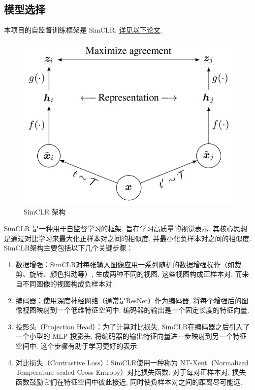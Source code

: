 \documentclass[notitlepage,cs4size,punct,oneside]{ctexrep}
\numberwithin{equation}{chapter}
\theoremstyle{mystyle}
\begin{document}
\subsection{模型选择}
本项目的自监督训练框架是 SimCLR, \href{http://proceedings.mlr.press/v119/chen20j/chen20j.pdf}{详见以下论文}.
\begin{figure}[H]
    \centering
    \includegraphics[scale=0.6]{simclr.png}
    \caption{SimCLR 架构}
\end{figure}
SimCLR 是一种用于自监督学习的框架, 旨在学习高质量的视觉表示. 其核心思想是通过对比学习来最大化正样本对之间的相似度, 并最小化负样本对之间的相似度. SimCLR架构主要包括以下几个关键步骤：
\begin{enumerate}
\item 数据增强：SimCLR对每张输入图像应用一系列随机的数据增强操作（如裁剪、旋转、颜色抖动等）, 生成两种不同的视图. 这些视图构成正样本对, 而来自不同图像的视图构成负样本对.

\item 编码器：使用深度神经网络（通常是ResNet）作为编码器, 将每个增强后的图像视图映射到一个低维特征空间中. 编码器的输出是一个固定长度的特征向量.

\item 投影头（Projection Head）：为了计算对比损失, SimCLR在编码器之后引入了一个小型的 MLP 投影头, 将编码器的输出特征向量进一步映射到另一个特征空间中. 这个步骤有助于学习更好的表示.

\item 对比损失（Contrastive Loss）：SimCLR使用一种称为 NT-Xent（Normalized Temperature-scaled Cross Entropy）对比损失函数. 对于每对正样本对, 损失函数鼓励它们在特征空间中彼此接近, 同时使负样本对之间的距离尽可能远.
\end{enumerate}
\end{document}

